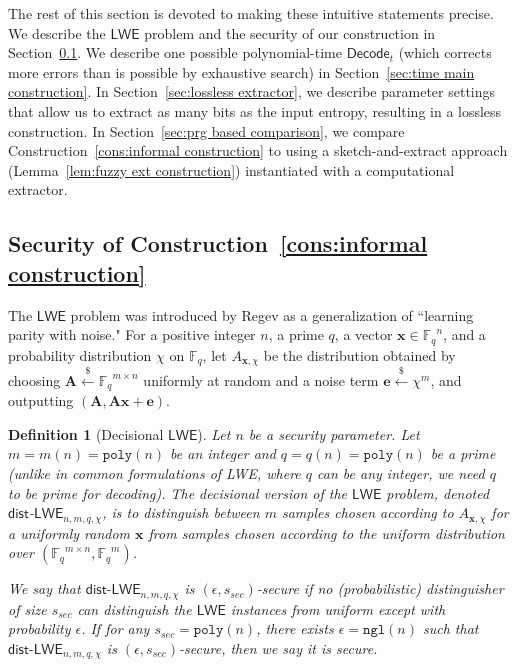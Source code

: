 \documentclass[11pt]{article}
\newcommand{\secref}[1]{\mbox{Section~\ref{#1}}}
\newcommand{\lemref}[1]{\mbox{Lemma~\ref{#1}}}
\newcommand{\consref}[1]{\mbox{Construction~\ref{#1}}}
\newcommand{\class}[1]{{\ensuremath{\mathsf{#1}}}}
\newcommand{\vect}[1]{\ensuremath{\textbf{#1}}}
\newcommand{\Fq}{\ensuremath{\mathbb{F}_q}}
\newcommand{\decode}{\ensuremath{\mathsf{Decode}}}
\newcommand{\poly}{\ensuremath{\mathtt{poly}}\xspace}
\newcommand{\ngl}{\ensuremath{\mathtt{ngl}}\xspace}
\newcommand{\lwe}{\class{LWE}}
\newcommand{\LWE}{\class{LWE}}
\newcommand{\distLWE}{\ensuremath{\class{dist\mbox{-}LWE}}}
\newtheorem{definition}[theorem]{Definition}
\newcommand{\ve}{\vect{e}}
\newcommand{\vA}{\vect{A}}
\newcommand{\vx}{\vect{x}}
\begin{document}
The rest of this section is devoted to making these intuitive statements precise.
 We describe the \class{LWE} problem and the security of our construction in \secref{subsec:LWE}.
We describe one possible polynomial-time $\decode_t$ (which corrects more errors than is possible by exhaustive search) in \secref{sec:time main construction}.  In \secref{sec:lossless extractor}, we describe parameter settings that allow us to extract as many bits as the input entropy, resulting in a lossless construction.  In \secref{sec:prg based comparison}, we compare \consref{cons:informal construction} to using a sketch-and-extract approach (\lemref{lem:fuzzy ext construction}) instantiated with a computational extractor. 



\subsection{Security of \consref{cons:informal construction}}
\label{subsec:LWE}
The $\LWE$ problem was introduced by Regev \cite{regev2005LWE, regevLWEsurvey} as a generalization of ``learning parity with noise." For a positive integer $n$,  a prime $q$, a vector $\vx \in \Fq^n$, and a probability distribution $\chi$ on $\Fq$, let $A_{\vect{x}, \chi}$ be the distribution obtained by choosing $\vA \overset{\$}\leftarrow \Fq^{m\times n}$ uniformly at random and a noise term $\ve \overset{\$}\leftarrow \chi^m$, and outputting $(\vA, \vA\vx+\ve)$. 

\begin{definition}[Decisional $\lwe$]\label{def:dist-LWE}Let $n$ be a security parameter.  
Let $m = m(n) = \poly(n)$ be an integer and $q = q(n) = \poly(n)$ be a prime (unlike in common formulations of LWE, where $q$ can be any integer, we need $q$ to be prime for decoding). The decisional version of the $\LWE$ problem, denoted \class{dist}-$\LWE_{n, m, q, \chi}$, is to distinguish between $m$ samples chosen according to $A_{\vx, \chi}$ for a uniformly random $\vx$ from samples chosen according to the uniform distribution over $(\Fq^{m\times n}, \Fq^m)$. 

We say that $\distLWE_{n, m, q, \chi}$ is $(\epsilon, s_{sec})$-secure if no (probabilistic) distinguisher of size $s_{sec}$ can distinguish the $\lwe$ instances from uniform except with probability $\epsilon$.  If for any $s_{sec} = \poly(n)$, there exists   $\epsilon  = \ngl(n)$ such that  $\distLWE_{n, m, q, \chi}$ is $(\epsilon, s_{sec})$-secure, then we say  it is \emph{secure}.
\end{definition}
\end{document}

